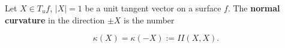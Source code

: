 Let $X \in T_u f$, $|X| = 1$ be a unit tangent vector on a surface $f$. The \textbf{normal curvature} in the direction $\pm X$ is the number

$$\kappa(X) = \kappa(-X) := II(X, X).$$
